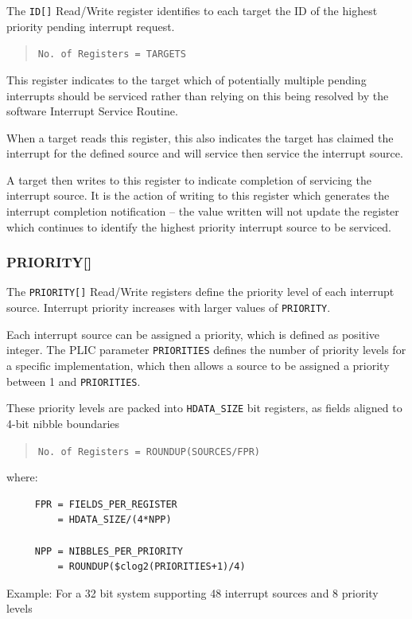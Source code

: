 The \texttt{ID[]} Read/Write register identifies to each target
the ID of the highest priority pending interrupt request.

\begin{quote}
	\texttt{No.\ of\ Registers\ =\ TARGETS}
\end{quote}

This register indicates to the target which of potentially multiple
pending interrupts should be serviced rather than relying on this being
resolved by the software Interrupt Service Routine.

When a target reads this register, this also indicates the target has
claimed the interrupt for the defined source and will service then
service the interrupt source.

A target then writes to this register to indicate completion of
servicing the interrupt source. It is the action of writing to this
register which generates the interrupt completion notification -- the
value written will not update the register which continues to identify
the highest priority interrupt source to be serviced.

\subsubsection{PRIORITY[]}

The \texttt{PRIORITY[]} Read/Write registers define the priority level of each interrupt source. Interrupt priority increases with larger values of \texttt{PRIORITY}.

Each interrupt source can be assigned a priority, which is defined as
positive integer. The PLIC parameter \texttt{PRIORITIES} defines the
number of priority levels for a specific implementation, which then
allows a source to be assigned a priority between 1 and
\texttt{PRIORITIES}.

These priority levels are packed into
\texttt{HDATA\_SIZE} bit registers, as fields aligned to
4-bit nibble boundaries

\begin{quote}
	\texttt{No.\ of\ Registers\ =\ ROUNDUP(SOURCES/FPR)}
\end{quote}
where:
\indent
\begin{verbatim}
     FPR = FIELDS_PER_REGISTER    
         = HDATA_SIZE/(4*NPP)

     NPP = NIBBLES_PER_PRIORITY
         = ROUNDUP($clog2(PRIORITIES+1)/4)
\end{verbatim}

Example: For a 32 bit system supporting 48 interrupt sources and 8
priority levels

